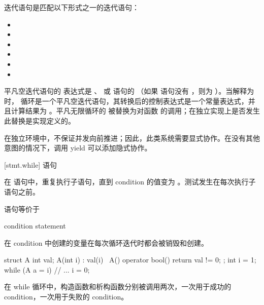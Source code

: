 \pnum
{} 迭代语句是匹配以下形式之一的迭代语句：
\begin{itemize}
\item {}  \tcode{) ;}
\item {}  \tcode{) \{ \}}
\item {}  \tcode{) ;}
\item {}  \tcode{) ;}
\item {}   \tcode{; ) ;}
\item {}   \tcode{; ) \{ \}}
\end{itemize}
平凡空迭代语句的 表达式是 、 或  语句的 （如果  语句没有 ，则为 ）。当解释为  时， 循环是一个平凡空迭代语句，其转换后的控制表达式是一个常量表达式，并且计算结果为 。平凡无限循环的  被替换为对函数  的调用；在独立实现上是否发生此替换是实现定义的。
\begin{note}
在独立环境中，不保证并发向前推进；因此，此类系统需要显式协作。在没有其他意图的情况下，调用 yield 可以添加隐式协作。
\end{note}

[stmt.while]{  语句}%

\pnum
在  语句中，重复执行子语句，直到 condition 的值变为 。测试发生在每次执行子语句之前。

\pnum
{}%
 语句等价于
\begin{ncsimplebnf}
 \terminal{:}\br
\terminal{\{}\br
\bnfindent {} \terminal{(} condition \terminal{)} \terminal{\{}\br
\bnfindent \bnfindent statement\br
\bnfindent \bnfindent {}  \terminal{;}\br
\bnfindent \terminal{\}}\br
\terminal{\}}
\end{ncsimplebnf}
\begin{note}
在 condition 中创建的变量在每次循环迭代时都会被销毁和创建。
\begin{example}
\begin{codeblock}
struct A {
  int val;
  A(int i) : val(i) { }
  ~A() { }
  operator bool() { return val != 0; }
};
int i = 1;
while (A a = i) {
  // ...
  i = 0;
}
\end{codeblock}
在 while 循环中，构造函数和析构函数分别被调用两次，一次用于成功的 condition，一次用于失败的 condition。
\end{example}
\end{note}

